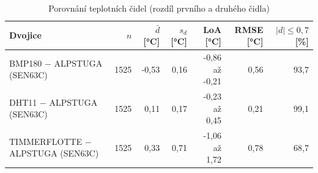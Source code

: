 \begin{table}[ht]
\centering
\caption{Porovnání teplotních čidel (rozdíl prvního a druhého čidla)}
\label{tab:porovnani-cidel}
\begin{tabular}{lrrrrrr}
\hline
Dvojice & $n$ & $\bar{d}$ [\si{\celsius}] & $s_d$ [\si{\celsius}] & LoA [\si{\celsius}] & RMSE [\si{\celsius}] & $|d|\le 0{,}7$ [\%] \\
\hline
BMP180 − ALPSTUGA (SEN63C) & 1525 & -0,53 & 0,16 & -0,86 až -0,21 & 0,56 & 93,7 \\
DHT11 − ALPSTUGA (SEN63C) & 1525 & 0,11 & 0,17 & -0,23 až 0,45 & 0,21 & 99,1 \\
TIMMERFLOTTE − ALPSTUGA (SEN63C) & 1525 & 0,33 & 0,71 & -1,06 až 1,72 & 0,78 & 68,7 \\
\hline
\end{tabular}
\end{table}